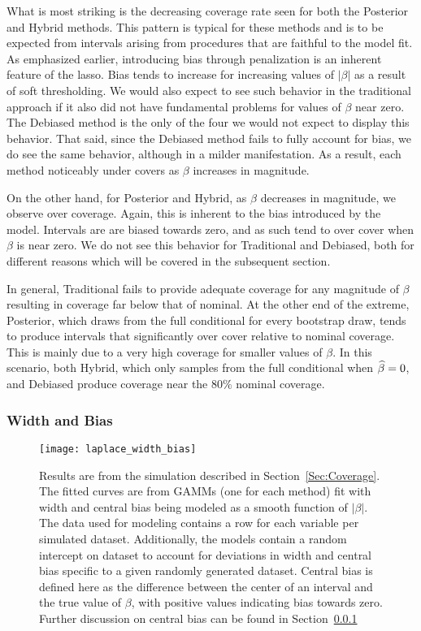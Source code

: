 What is most striking is the decreasing coverage rate seen for both the Posterior and Hybrid methods. This pattern is typical for these methods and is to be expected from intervals arising from procedures that are faithful to the model fit. As emphasized earlier, introducing bias through penalization is an inherent feature of the lasso. Bias tends to increase for increasing values of $|\beta|$ as a result of soft thresholding. We would also expect to see such behavior in the traditional approach if it also did not have fundamental problems for values of $\beta$ near zero. The Debiased method is the only of the four we would not expect to display this behavior. That said, since the Debiased method fails to fully account for bias, we do see the same behavior, although in a milder manifestation. As a result, each method noticeably under covers as $\beta$ increases in magnitude.

On the other hand, for Posterior and Hybrid, as $\beta$ decreases in magnitude, we observe over coverage. Again, this is inherent to the bias introduced by the model. Intervals are are biased towards zero, and as such tend to over cover when $\beta$ is near zero. We do not see this behavior for Traditional and Debiased, both for different reasons which will be covered in the subsequent section. 

In general, Traditional fails to provide adequate coverage for any magnitude of $\beta$ resulting in coverage far below that of nominal. At the other end of the extreme, Posterior, which draws from the full conditional for every bootstrap draw, tends to produce intervals that significantly over cover relative to nominal coverage. This is mainly due to a very high coverage for smaller values of $\beta$. In this scenario, both Hybrid, which only samples from the full conditional when $\widehat{\beta} = 0$, and Debiased produce coverage near the $80\%$ nominal coverage.

\subsubsection{Width and Bias}\label{Sec:Width and Bias}

\begin{figure}
  \texttt{[image: laplace\_width\_bias]}
  \caption{\label{Fig:laplace_width_bias} Results are from the simulation described in Section~\ref{Sec:Coverage}. The fitted curves are from GAMMs (one for each method) fit with width and central bias being modeled as a smooth function of $|\beta|$. The data used for modeling contains a row for each variable per simulated dataset. Additionally, the models contain a random intercept on dataset to account for deviations in width and central bias specific to a given randomly generated dataset. Central bias is defined here as the difference between the center of an interval and the true value of $\beta$, with positive values indicating bias towards zero. Further discussion on central bias can be found in Section~\ref{Sec:Width and Bias}}
\end{figure}

